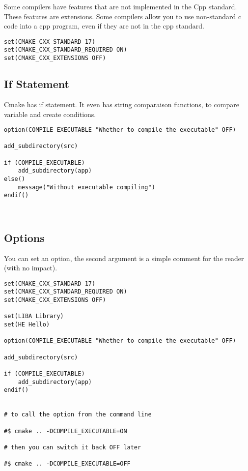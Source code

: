 \documentclass[openany]{report}
\begin{document}
Some compilers have features that are not implemented in the Cpp standard. These features are extensions.
Some compilers allow you to use non-standard c code into a cpp program, even if they are not in the cpp standard.

\begin{verbatim}
set(CMAKE_CXX_STANDARD 17)
set(CMAKE_CXX_STANDARD_REQUIRED ON)
set(CMAKE_CXX_EXTENSIONS OFF)
\end{verbatim}

\subsection{If Statement}

Cmake has if statement. It even has string comparaison functions, to compare variable and create conditions.

\begin{verbatim}
option(COMPILE_EXECUTABLE "Whether to compile the executable" OFF)

add_subdirectory(src)

if (COMPILE_EXECUTABLE)
    add_subdirectory(app)
else()
    message("Without executable compiling")
endif()



\end{verbatim}


\subsection{Options}

You can set an option, the second argument is a simple comment for the reader (with no impact).

\begin{verbatim}
set(CMAKE_CXX_STANDARD 17)
set(CMAKE_CXX_STANDARD_REQUIRED ON)
set(CMAKE_CXX_EXTENSIONS OFF)

set(LIBA Library)
set(HE Hello)

option(COMPILE_EXECUTABLE "Whether to compile the executable" OFF)

add_subdirectory(src)

if (COMPILE_EXECUTABLE)
    add_subdirectory(app)
endif()


# to call the option from the command line

#$ cmake .. -DCOMPILE_EXECUTABLE=ON

# then you can switch it back OFF later

#$ cmake .. -DCOMPILE_EXECUTABLE=OFF
\end{verbatim}
\end{document}
